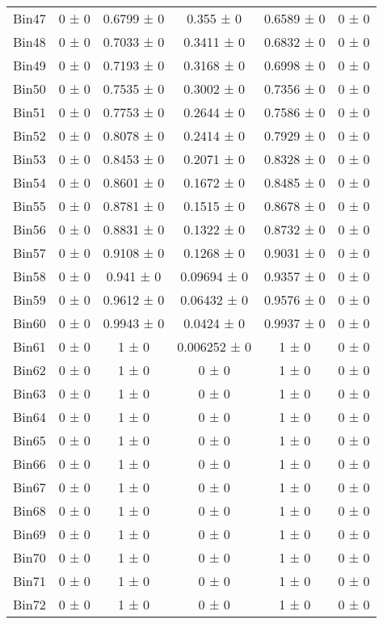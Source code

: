 \begin{tabular}{@{\extracolsep{4pt}}lccccc@{}}
     Bin47 & 0 ± 0 & 0.6799 ± 0 & 0.355 ± 0 & 0.6589 ± 0 & 0 ± 0 \\ 
     Bin48 & 0 ± 0 & 0.7033 ± 0 & 0.3411 ± 0 & 0.6832 ± 0 & 0 ± 0 \\ 
     Bin49 & 0 ± 0 & 0.7193 ± 0 & 0.3168 ± 0 & 0.6998 ± 0 & 0 ± 0 \\ 
     Bin50 & 0 ± 0 & 0.7535 ± 0 & 0.3002 ± 0 & 0.7356 ± 0 & 0 ± 0 \\ 
     Bin51 & 0 ± 0 & 0.7753 ± 0 & 0.2644 ± 0 & 0.7586 ± 0 & 0 ± 0 \\ 
     Bin52 & 0 ± 0 & 0.8078 ± 0 & 0.2414 ± 0 & 0.7929 ± 0 & 0 ± 0 \\ 
     Bin53 & 0 ± 0 & 0.8453 ± 0 & 0.2071 ± 0 & 0.8328 ± 0 & 0 ± 0 \\ 
     Bin54 & 0 ± 0 & 0.8601 ± 0 & 0.1672 ± 0 & 0.8485 ± 0 & 0 ± 0 \\ 
     Bin55 & 0 ± 0 & 0.8781 ± 0 & 0.1515 ± 0 & 0.8678 ± 0 & 0 ± 0 \\ 
     Bin56 & 0 ± 0 & 0.8831 ± 0 & 0.1322 ± 0 & 0.8732 ± 0 & 0 ± 0 \\ 
     Bin57 & 0 ± 0 & 0.9108 ± 0 & 0.1268 ± 0 & 0.9031 ± 0 & 0 ± 0 \\ 
     Bin58 & 0 ± 0 & 0.941 ± 0 & 0.09694 ± 0 & 0.9357 ± 0 & 0 ± 0 \\ 
     Bin59 & 0 ± 0 & 0.9612 ± 0 & 0.06432 ± 0 & 0.9576 ± 0 & 0 ± 0 \\ 
     Bin60 & 0 ± 0 & 0.9943 ± 0 & 0.0424 ± 0 & 0.9937 ± 0 & 0 ± 0 \\ 
     Bin61 & 0 ± 0 & 1 ± 0 & 0.006252 ± 0 & 1 ± 0 & 0 ± 0 \\ 
     Bin62 & 0 ± 0 & 1 ± 0 & 0 ± 0 & 1 ± 0 & 0 ± 0 \\ 
     Bin63 & 0 ± 0 & 1 ± 0 & 0 ± 0 & 1 ± 0 & 0 ± 0 \\ 
     Bin64 & 0 ± 0 & 1 ± 0 & 0 ± 0 & 1 ± 0 & 0 ± 0 \\ 
     Bin65 & 0 ± 0 & 1 ± 0 & 0 ± 0 & 1 ± 0 & 0 ± 0 \\ 
     Bin66 & 0 ± 0 & 1 ± 0 & 0 ± 0 & 1 ± 0 & 0 ± 0 \\ 
     Bin67 & 0 ± 0 & 1 ± 0 & 0 ± 0 & 1 ± 0 & 0 ± 0 \\ 
     Bin68 & 0 ± 0 & 1 ± 0 & 0 ± 0 & 1 ± 0 & 0 ± 0 \\ 
     Bin69 & 0 ± 0 & 1 ± 0 & 0 ± 0 & 1 ± 0 & 0 ± 0 \\ 
     Bin70 & 0 ± 0 & 1 ± 0 & 0 ± 0 & 1 ± 0 & 0 ± 0 \\ 
     Bin71 & 0 ± 0 & 1 ± 0 & 0 ± 0 & 1 ± 0 & 0 ± 0 \\ 
     Bin72 & 0 ± 0 & 1 ± 0 & 0 ± 0 & 1 ± 0 & 0 ± 0 \\ 

\end{tabular}
